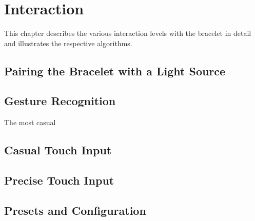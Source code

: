 \chapter{Interaction}

This chapter describes the various interaction levels with the bracelet in detail and illustrates the respective algorithms.

\section{Pairing the Bracelet with a Light Source}

\section{Gesture Recognition}
The most casual 

\section{Casual Touch Input}

\section{Precise Touch Input}

\section{Presets and Configuration}